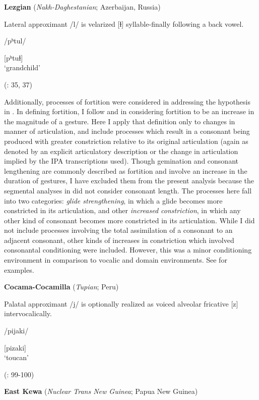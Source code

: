 \ea\label{ex:7.8}
  \textbf{Lezgian} (\textit{Nakh-Daghestanian}; Azerbaijan, Russia)

Lateral approximant /l/ is velarized [ɫ] syllable-finally following a back vowel.

/pʰtul/

[pʰtuɫ]\\
\glt ‘grandchild’

(\citealt{Haspelmath1993}: 35, 37)
\z

  Additionally, processes of fortition were considered in addressing the hypothesis in . In defining fortition, I follow \citet{Bybee2015b} and \citet{BybeeEasterday2019} in considering fortition to be an increase in the magnitude of a gesture. Here I apply that definition only to changes in manner of articulation, and include processes which result in a consonant being produced with greater constriction relative to its original articulation (again as denoted by an explicit articulatory description or the change in articulation implied by the IPA transcriptions used). Though gemination and consonant lengthening are commonly described as fortition and involve an increase in the duration of gestures, I have excluded them from the present analysis because the segmental analyses in  did not consider consonant length. The processes here fall into two categories: \textit{glide strengthening}, in which a glide becomes more constricted in its articulation, and other \textit{increased constriction}, in which any other kind of consonant becomes more constricted in its articulation. While I did not include processes involving the total assimilation of a consonant to an adjacent consonant, other kinds of increases in constriction which involved consonantal conditioning were included. However, this was a minor conditioning environment in comparison to vocalic and domain environments. See  for examples.

\ea\label{ex:7.9}
  \textbf{Cocama-Cocamilla} (\textit{Tupian}; Peru)

Palatal approximant /j/ is optionally realized as voiced alveolar fricative [z] intervocalically.

/pijaki/

[pizaki]\\
\glt ‘toucan’

(\citealt{VallejosYopán2010}: 99-100)
\z

\ea\label{ex:7.10}
  \textbf{East Kewa} (\textit{Nuclear Trans New Guinea}; Papua New Guinea)

